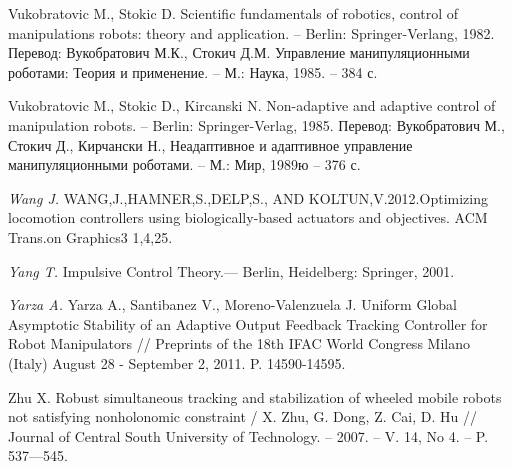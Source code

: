 \begin{thebibliography}{10}
	 Vukobratovic M., Stokic D. Scientific fundamentals of robotics, control of manipulations robots: theory and application. – Berlin: Springer-Verlang, 1982. Перевод: Вукобратович М.К., Стокич Д.М. Управление манипуляционными роботами: Теория и применение. – М.: Наука, 1985. – 384 с.
	
	 Vukobratovic M., Stokic D., Kircanski N. Non-adaptive and adaptive control of manipulation robots. – Berlin: Springer-Verlag, 1985. Перевод: Вукобратович М., Стокич Д., Кирчански Н., Неадаптивное и адаптивное управление манипуляционными роботами. – М.: Мир, 1989ю – 376 с.
	
	{\it Wang J.} WANG,J.,HAMNER,S.,DELP,S., AND KOLTUN,V.2012.Optimizing locomotion controllers using biologically-based actuators and objectives. ACM Trans.on Graphics3 1,4,25.
	
	{\it Yang T.} Impulsive Control Theory.— Berlin, Heidelberg: Springer, 2001.
	
	{\it Yarza A.} Yarza A., Santibanez V., Moreno-Valenzuela J. Uniform Global Asymptotic Stability of an Adaptive Output Feedback Tracking Controller for Robot Manipulators // Preprints of the 18th IFAC World Congress Milano (Italy) August 28 - September 2, 2011. P. 14590-14595. 
	
	 Zhu X. Robust simultaneous tracking and stabilization of wheeled mobile robots not satisfying nonholonomic constraint / X. Zhu, G. Dong, Z. Cai, D. Hu // Journal of Central South University of Technology. – 2007. – V. 14, No 4. – P. 537—545.
	
	
\end{thebibliography} 